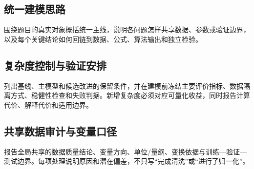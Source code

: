 \subsection{统一建模思路}

围绕题目的真实对象概括统一主线，说明各问题怎样共享数据、参数或验证边界，以及每个关键结论如何回链到数据、公式、算法输出和独立检验。

\subsection{复杂度控制与验证安排}

列出基线、主模型和候选改进的保留条件，并在建模前冻结主要评价指标、数据隔离方式、稳健性检查和失败判据。新增复杂度必须对应可量化收益，同时报告计算代价、解释代价和适用边界。

\subsection{共享数据审计与变量口径}

报告全局共享的数据质量结论、变量方向、单位/量纲、变换依据与训练—验证—测试边界。每项处理说明原因和潜在偏差，不只写“完成清洗”或“进行了归一化”。
